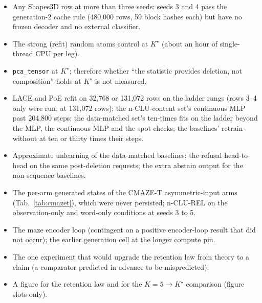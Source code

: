 \documentclass{article} %
\newcommand{\Kstar}{\ensuremath{K^{\star}}}
\begin{document}
\begin{itemize}
\item Any Shapes3D row at more than three seeds: seeds 3 and 4 pass the generation-2 cache rule
  (480,000 rows, 59 block hashes each) but have no frozen decoder and no external classifier.
\item The strong (refit) random atoms control at $\Kstar$ (about an hour of
  single-thread CPU per leg). %
\item \texttt{pca\_tensor} at $\Kstar$; therefore whether ``the statistic provides deletion,
not composition'' holds at $\Kstar$ is not measured.
\item LACE and PoE refit on 32,768 or 131,072 rows on the ladder rungs (rows 3--4 only were run, at %
  131,072 rows); the n-CLU-content set's continuous MLP past 204,800 steps; the data-matched set's ten-times fits on the ladder %
  beyond the MLP, the continuous MLP and the spot checks; the baselines' retrain-without at ten or
  thirty times their steps.
\item Approximate unlearning of the data-matched baselines; the refusal head-to-head on the same
  post-deletion requests; the extra abstain output for the non-sequence baselines.
\item The per-arm generated states of the CMAZE-T asymmetric-input arms (Tab.~\ref{tab:cmazet}),
  which were never persisted; n-CLU-REL on the observation-only and word-only
  conditions at seeds 3 to 5.
\item The maze encoder loop (contingent on a positive encoder-loop result that did not occur); the
  earlier generation cell at the longer compute pin.
\item The one experiment that would upgrade the retention law from theory to a claim (a comparator
  predicted in advance to be mispredicted).
\item A figure for the retention law and for the $K=5\to\Kstar$
  comparison (figure slots only).
\end{itemize}

\end{document}
